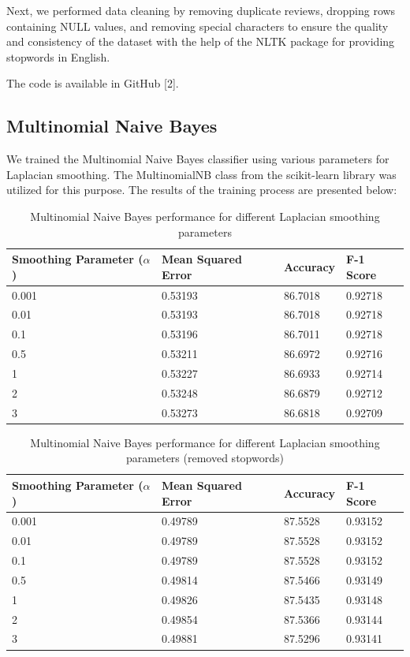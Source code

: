 \documentclass{article}
\begin{document}
Next, we performed data cleaning by removing duplicate reviews, dropping rows containing NULL values, and removing special characters to ensure the quality and consistency of the dataset with the help of the NLTK package for providing stopwords in English.

The code is available in GitHub [2].

\subsection{Multinomial Naive Bayes}

We trained the Multinomial Naive Bayes classifier using various parameters for Laplacian smoothing. The MultinomialNB class from the scikit-learn library was utilized for this purpose. The results of the training process are presented below:

\begin{table}[h]
\centering
\begin{tabular}{llll}
\toprule
\textbf{Smoothing Parameter ($\alpha$)} & \textbf{Mean Squared Error} & \textbf{Accuracy} & \textbf{F-1 Score} \\
\midrule
0.001 & 0.53193 & 86.7018 & 0.92718 \\
0.01 & 0.53193 & 86.7018 & 0.92718 \\
0.1 & 0.53196 & 86.7011 & 0.92718 \\
0.5 & 0.53211 & 86.6972 & 0.92716 \\
1 & 0.53227 & 86.6933 & 0.92714 \\
2 & 0.53248 & 86.6879 & 0.92712 \\
3 & 0.53273 & 86.6818 & 0.92709 \\
\bottomrule
\end{tabular}
\caption{Multinomial Naive Bayes performance for different Laplacian smoothing parameters}
\label{table:naive_bayes_results}
\end{table}

\begin{table}[h]
\centering
\begin{tabular}{llll}
\toprule
\textbf{Smoothing Parameter ($\alpha$)} & \textbf{Mean Squared Error} & \textbf{Accuracy} & \textbf{F-1 Score} \\
\midrule
0.001 & 0.49789 & 87.5528 & 0.93152 \\
0.01 & 0.49789 & 87.5528 & 0.93152 \\
0.1 & 0.49789 & 87.5528 & 0.93152 \\
0.5 & 0.49814 & 87.5466 & 0.93149 \\
1 & 0.49826 & 87.5435 & 0.93148 \\
2 & 0.49854 & 87.5366 & 0.93144 \\
3 & 0.49881 & 87.5296 & 0.93141 \\
\bottomrule
\end{tabular}
\caption{Multinomial Naive Bayes performance for different Laplacian smoothing parameters (removed stopwords)}
\label{table:naive_bayes_results_removed_stopwords}
\end{table}
\end{document}
